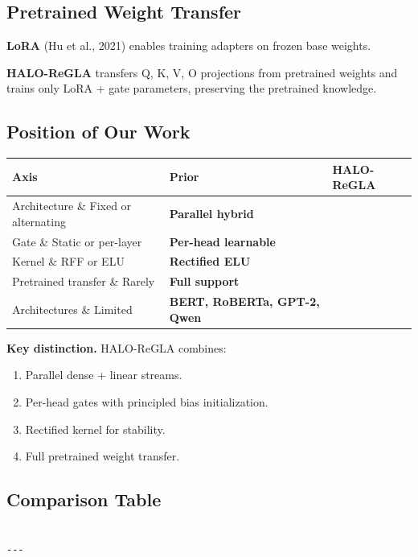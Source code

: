 \subsection{Pretrained Weight Transfer}

\textbf{LoRA} (Hu et al., 2021) enables training adapters on frozen base weights.

\textbf{HALO-ReGLA} transfers Q, K, V, O projections from pretrained weights and 
trains only LoRA + gate parameters, preserving the pretrained knowledge.

\subsection{Position of Our Work}

\begin{table}[H]
\centering
\small
\begin{tabular}{lll}
\toprule
\textbf{Axis} & \textbf{Prior} & \textbf{HALO-ReGLA} \\
\midrule
Architecture \& Fixed or alternating & \textbf{Parallel hybrid} \\
Gate \& Static or per-layer & \textbf{Per-head learnable} \\
Kernel \& RFF or ELU & \textbf{Rectified ELU} \\
Pretrained transfer \& Rarely & \textbf{Full support} \\
Architectures \& Limited & \textbf{BERT, RoBERTa, GPT-2, Qwen} \\
\bottomrule
\end{tabular}
\end{table}

\textbf{Key distinction.} HALO-ReGLA combines:
\begin{enumerate}
\item Parallel dense + linear streams.
\item Per-head gates with principled bias initialization.
\item Rectified kernel for stability.
\item Full pretrained weight transfer.

\end{enumerate}
\subsection{Comparison Table}

\begin{lstlisting}

---
\end{lstlisting}